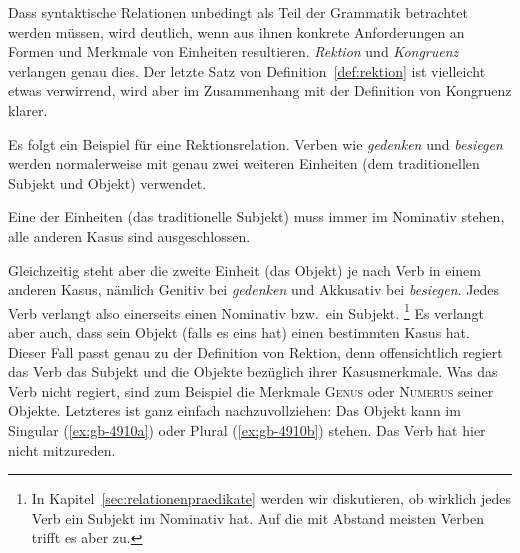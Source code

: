 Dass syntaktische Relationen unbedingt als Teil der Grammatik betrachtet werden müssen, wird deutlich, wenn aus ihnen konkrete Anforderungen an Formen und Merkmale von Einheiten resultieren.
\textit{Rektion} und \textit{Kongruenz} verlangen genau dies.
Der letzte Satz von Definition~\ref{def:rektion} ist vielleicht etwas verwirrend, wird aber im Zusammenhang mit der Definition von Kongruenz klarer.


Es folgt ein Beispiel für eine Rektionsrelation.
Verben wie \textit{gedenken} und \textit{besiegen} werden normalerweise mit genau zwei weiteren Einheiten (dem traditionellen Subjekt und Objekt) verwendet.

\begin{exe}
\end{exe}

Eine der Einheiten (das traditionelle Subjekt) muss immer im Nominativ stehen, alle anderen Kasus sind ausgeschlossen.

\begin{exe}
  \ex
  \begin{xlist}
  \end{xlist}
\end{exe}

Gleichzeitig steht aber die zweite Einheit (das Objekt) je nach Verb in einem anderen Kasus, nämlich Genitiv bei \textit{gedenken} und Akkusativ bei \textit{besiegen}.
Jedes Verb verlangt also einerseits einen Nominativ bzw.\ ein Subjekt.%
\footnote{In Kapitel~\ref{sec:relationenpraedikate} werden wir diskutieren, ob wirklich jedes Verb ein Subjekt im Nominativ hat.
Auf die mit Abstand meisten Verben trifft es aber zu.}
Es verlangt aber auch, dass sein Objekt (falls es eins hat) einen bestimmten Kasus hat.
Dieser Fall passt genau zu der Definition von Rektion, denn offensichtlich regiert das Verb das Subjekt und die Objekte bezüglich ihrer Kasusmerkmale.
Was das Verb nicht regiert, sind zum Beispiel die Merkmale \textsc{Genus} oder \textsc{Numerus} seiner Objekte.
Letzteres ist ganz einfach nachzuvollziehen:
Das Objekt kann im Singular (\ref{ex:gb-4910a}) oder Plural (\ref{ex:gb-4910b}) stehen.
Das Verb hat hier nicht mitzureden.

